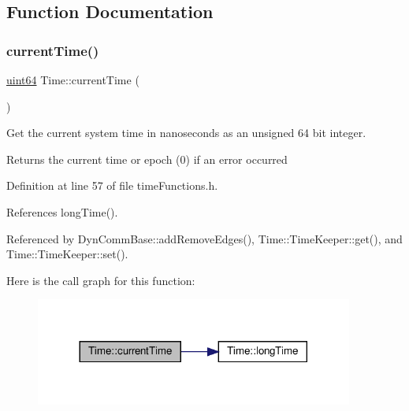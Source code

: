 \subsection{Function Documentation}
\mbox{\label{namespaceTime_ae414566445c9d392bb148cc98fe2cece}} 
\subsubsection{\texorpdfstring{current\+Time()}{currentTime()}}
{\footnotesize\ttfamily \hyperlink{systemDefines_8h_abc0f5bc07737e498f287334775dff2b6}{uint64} Time\+::current\+Time (\begin{DoxyParamCaption}{ }\end{DoxyParamCaption})\hspace{0.3cm}{\ttfamily [inline]}}



Get the current system time in nanoseconds as an unsigned 64 bit integer. 

\begin{DoxyReturn}{Returns}
the current time or epoch (0) if an error occurred 
\end{DoxyReturn}


Definition at line 57 of file time\+Functions.\+h.



References long\+Time().



Referenced by Dyn\+Comm\+Base\+::add\+Remove\+Edges(), Time\+::\+Time\+Keeper\+::get(), and Time\+::\+Time\+Keeper\+::set().

Here is the call graph for this function\+:\nopagebreak
\begin{figure}[H]
\begin{center}
\leavevmode
\includegraphics[width=296pt]{namespaceTime_ae414566445c9d392bb148cc98fe2cece_cgraph}
\end{center}
\end{figure}
\mbox{\label{namespaceTime_a57ff57387f9a60589ccdbe9215843ffe}} 
